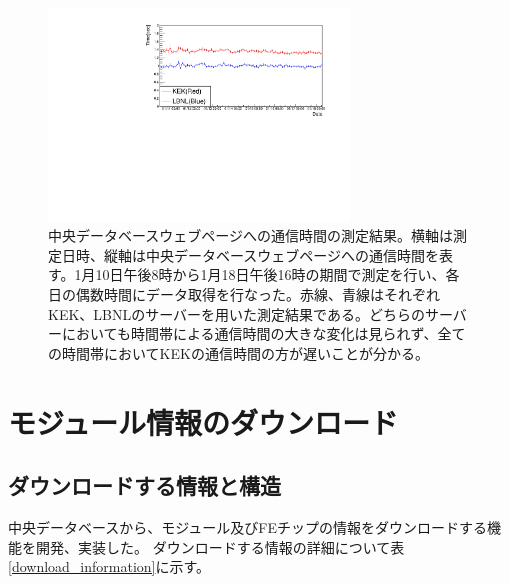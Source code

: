\begin{figure}[bpt]\centering
  \begin{center}
    \includegraphics[width=8cm,angle=270]{./monitor_accessing_time.pdf}
  \caption[中央データベースウェブページへの通信時間の測定結果]{中央データベースウェブページへの通信時間の測定結果。横軸は測定日時、縦軸は中央データベースウェブページへの通信時間を表す。1月10日午後8時から1月18日午後16時の期間で測定を行い、各日の偶数時間にデータ取得を行なった。赤線、青線はそれぞれKEK、LBNLのサーバーを用いた測定結果である。どちらのサーバーにおいても時間帯による通信時間の大きな変化は見られず、全ての時間帯においてKEKの通信時間の方が遅いことが分かる。}
  \label{monitor_accessing_time}
  \end{center}
\end{figure}



\clearpage
\section{モジュール情報のダウンロード}
\subsection{ダウンロードする情報と構造}
中央データベースから、モジュール及びFEチップの情報をダウンロードする機能を開発、実装した。
ダウンロードする情報の詳細について表\ref{download_information}に示す。

